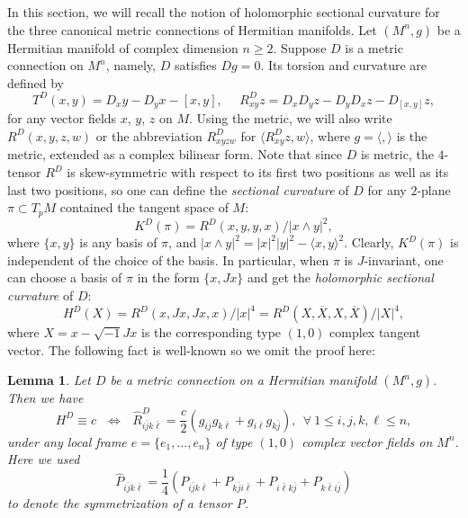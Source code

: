 \documentclass{amsart}
\newtheorem{lemma}{Lemma}
\numberwithin{equation}{section}
\begin{document}
In this section, we will recall the notion of holomorphic sectional curvature for the three canonical metric connections of Hermitian manifolds. Let $(M^n,g)$ be a Hermitian manifold of complex dimension $n\geq 2$. Suppose $D$ is a metric connection on $M^n$, namely, $D$ satisfies $Dg=0$. Its torsion and curvature are defined by
$$ T^D(x,y)=D_xy-D_yx-[x,y], \ \ \ \ \ \ R^D_{xy}z=D_xD_yz-D_yD_xz -D_{[x,y]}z, $$
for any vector fields $x$, $y$, $z$ on $M$. Using the metric, we will also write $R^D(x,y,z,w)$ or the abbreviation $R^D_{xyzw}$ for $\langle R^D_{xy}z, w\rangle$, where $g=\langle , \rangle$ is the metric, extended as a complex bilinear form. Note that since $D$ is metric, the $4$-tensor $R^D$ is skew-symmetric with respect to its first two positions as well as its last two positions, so one can define the {\em sectional curvature} of $D$ for any $2$-plane $\pi \subset T_pM$ contained the tangent space of $M$:
\begin{equation*}
K^D(\pi ) = R^D(x,y,y,x)/ |x\wedge y|^2,
\end{equation*}
where $\{x,y\}$ is any basis of $\pi$, and $|x\wedge y|^2 =|x|^2|y|^2 - \langle x,y\rangle^2$. Clearly, $K^D(\pi)$ is independent of the choice of the basis. In particular, when $\pi$ is $J$-invariant, one can choose a basis of $\pi$ in the form $\{ x,Jx\}$ and get the  {\em holomorphic sectional curvature} of $D$:
\begin{equation}
H^D(X) = R^D(x,Jx,Jx,x)/ |x|^4 = R^D(X,\overline{X}, X, \overline{X})/|X|^4,
\end{equation}
where $X=x-\sqrt{-1}Jx$ is the corresponding type $(1,0)$ complex tangent vector. The following fact is well-known so we omit the proof here:
\begin{lemma}\label{lemma1}
Let \(D\) be a  metric connection on a Hermitian manifold \((M^n,g)\).  Then
we have
\begin{equation}\label{eq:H=c}
H^D\equiv c   \ \ \ \Longleftrightarrow \ \ \ \widehat R^D_{i\bar j k\bar\ell}
 =\frac{c}{2}
 \left(g_{i\bar{j}}g_{k\bar{\ell}}
      +g_{i\bar{\ell}}g_{k\bar{j}}\right), \ \ \forall \ 1\leq i,j,k,\ell \leq n,
\end{equation}
under any local frame $e=\{ e_1, \ldots , e_n\}$ of type $(1,0)$ complex vector fields on $M^n$. Here we used
\begin{equation}\label{eq:sym}
 \widehat P_{i\bar j k\bar\ell}
 =\frac14\left(
 P_{i\bar j k\bar\ell}
 +P_{k\bar j i\bar\ell}
 +P_{i\bar\ell k\bar j}
 +P_{k\bar\ell i\bar j}\right)
\end{equation}
to denote the symmetrization of a tensor $P$.
\end{lemma}
\end{document}
